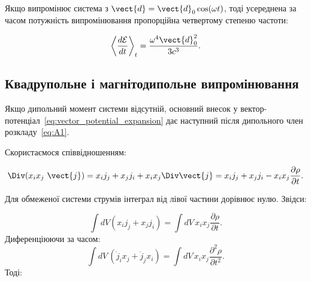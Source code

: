 %

Якщо випромінює система з \( \vect{d} = \vect{d}_0 \cos(\omega t) \), тоді усереднена за часом потужність випромінювання
пропорційна четвертому степеню частоти:

\begin{equation*}
	\left\langle \frac{d\mathcal{E}}{dt} \right\rangle_t = \frac{\omega^4 \vect{d}_0^2}{3c^3}.
\end{equation*}

\subsection*{Квадрупольне і магнітодипольне випромінювання}

Якщо дипольний момент системи відсутній, основний внесок у вектор-по\-тен\-ці\-ал~\eqref{eq:vector_potential_expansion}
дає наступний після дипольного член розкладу~\eqref{eq:A1}.

Скористаємося співвідношенням:

\begin{equation*}
	\Div(x_i x_j\ \vect{j}) = x_i j_j + x_j j_i + x_i x_j \Div \vect{j} = x_i j_j + x_j j_i - x_i x_j \frac{\partial \rho}{\partial t}.
\end{equation*}

Для обмеженої системи струмів інтеграл від лівої частини дорівнює нулю. Звідси:

\begin{equation*}
    \int dV (x_i j_j + x_j j_i) = \int dV\, x_i x_j \frac{\partial \rho}{\partial t}.
\end{equation*}
%
Диференціюючи за часом:
\begin{equation*}
    \int dV\,(\dot{j}_i x_j + \dot{j}_j x_i) = \int dV\, x_i x_j \frac{\partial^2\rho}{\partial t^2}.
\end{equation*}
%
Тоді:

